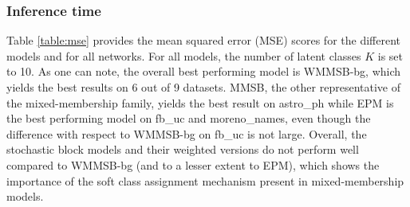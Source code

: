 \begin{table*}[ht]
\centering
	
\label{table:mse}
\end{table*}

\begin{figure*}[ht]
\centering
	
   \label{fig:k_evolv}
\end{figure*}


\subsubsection{Inference time} 

\begin{table*}[ht]
\centering
	
\label{table:time}
\end{table*}

\begin{figure*}[ht]
\centering
	
\label{fig:conv_entropy}
\end{figure*}

Table \ref{table:mse} provides the mean squared error (MSE) scores for the different models and for all networks. For all models, the number of latent classes $K$ is set to 10.
As one can note, the overall best performing model is WMMSB-bg, which yields the best results on 6 out of 9 datasets. MMSB, the other representative of the mixed-membership family, yields the best result on astro\_ph while EPM is the best performing model on fb\_uc and moreno\_names, even though the difference with respect to WMMSB-bg on fb\_uc is not large. Overall, the stochastic block models and their weighted versions do not perform well compared to WMMSB-bg (and to a lesser extent to EPM), which shows the importance of the soft class assignment mechanism present in mixed-membership models. 


